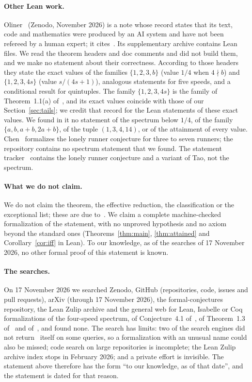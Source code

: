 \documentclass[11pt]{article}
\theoremstyle{remark}
\begin{document}
\paragraph{Other Lean work.} Oliner~\cite{Oliner} (Zenodo, November 2026) is a note whose record states that its text, code and mathematics were produced by an AI system and have not been refereed by a human expert; it cites~\cite{YGB}. Its supplementary archive contains Lean files. We read the theorem headers and doc comments and did not build them, and we make no statement about their correctness. According to those headers they state the exact values of the families $\{1,2,3,b\}$ (value $1/4$ when $4\nmid b$) and $\{1,2,3,4s\}$ (value $s/(4s+1)$), analogous statements for five speeds, and a conditional result for quintuples. The family $\{1,2,3,4s\}$ is the family of Theorem~1.1(a) of~\cite{YGB}, and its exact values coincide with those of our Section~\ref{sec:tails}; we credit that record for the Lean statements of these exact values. We found in it no statement of the spectrum below $1/4$, of the family $\{a,b,a+b,2a+b\}$, of the tuple $(1,3,4,14)$, or of the attainment of every value. Chen~\cite{Chen} formalizes the lonely runner conjecture for three to seven runners; the repository contains no spectrum statement that we found. The statement tracker~\cite{FC} contains the lonely runner conjecture and a variant of Tao, not the spectrum.

\paragraph{What we do not claim.} We do not claim the theorem, the effective reduction, the classification or the exceptional list; these are due to~\cite{YGB}. We claim a complete machine-checked formalization of the statement, with no unproved hypothesis and no axiom beyond the standard ones (Theorems~\ref{thm:main}, \ref{thm:attained} and Corollary~\ref{cor:iff} in Lean). To our knowledge, as of the searches of 17 November 2026, no other formal proof of this statement is known.

\paragraph{The searches.} On 17 November 2026 we searched Zenodo, GitHub (repositories, code, issues and pull requests), arXiv (through 17 November 2026), the formal-conjectures repository, the Lean Zulip archive and the general web for Lean, Isabelle or Coq formalizations of the four-speed spectrum, of Conjecture~4.1 of~\cite{FanSun}, of Theorem~1.3 of~\cite{JK} and of~\cite{YGB}, and found none. The search has limits: two of the search engines did not return~\cite{YGB} itself on some queries, so a formalization with an unusual name could also be missed; code search on large repositories is incomplete; the Lean Zulip archive index stops in February 2026; and a private effort is invisible. The statement above therefore has the form ``to our knowledge, as of that date'', and the statement is dated for that reason.
\end{document}
